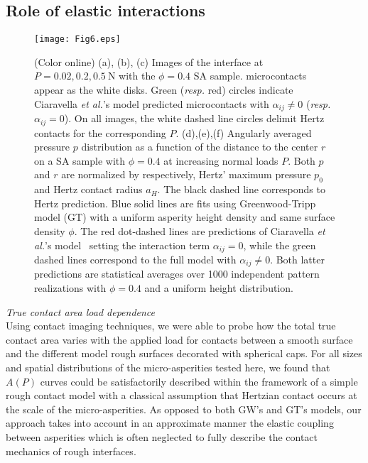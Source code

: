 \documentclass[pre,groupedaddress,showkeys,showpacs,twocolumn]{revtex4}
\begin{document}
\subsection*{Role of elastic interactions}
%
\begin{figure*}[ht]
	\centering
	\texttt{[image: Fig6.eps]}
	\caption{(Color online) (a), (b), (c) Images of the interface at $P=0.02, 0.2, 0.5~$N with the $\phi=0.4$ SA sample. microcontacts appear as the white disks. Green (\textit{resp.} red) circles indicate Ciaravella \textit{et al.}'s model predicted microcontacts with $\alpha_{ij} \neq 0$ (\textit{resp.} $\alpha_{ij} = 0$). On all images, the white dashed line circles delimit Hertz contacts for the corresponding $P$. (d),(e),(f) Angularly averaged pressure $p$ distribution as a function of the distance to the center $r$ on a SA sample with $\phi = 0.4$ at increasing normal loads $P$. Both $p$ and $r$ are normalized by respectively, Hertz' maximum pressure $p_0$ and Hertz contact radius $a_H$. The black dashed line corresponds to Hertz prediction. Blue solid lines are fits using Greenwood-Tripp model (GT) with a uniform asperity height density and same surface density $\phi$. The red dot-dashed lines are predictions of Ciaravella \textit{et al.}'s model~\cite{ciavarella2006,ciavarella2008} setting the 
		interaction term $\alpha_{ij}=0$, while the green dashed lines correspond to the full model with $\alpha_{ij} \neq 0$. Both latter predictions are statistical averages over 1000 independent pattern realizations with $\phi=0.4$ and a uniform height distribution.}
	\label{fig:contact_area_pprofiles} 
\end{figure*}
%
\textit{True contact area load dependence}\\
%
\indent Using contact imaging techniques, we were able to probe how the total true contact area varies with the applied load for contacts between a smooth surface and the different model rough surfaces decorated with spherical caps. For all sizes and spatial distributions of the micro-asperities tested here, we found that $A(P)$ curves could be satisfactorily described within the framework of a simple rough contact model with a classical assumption that Hertzian contact occurs at the scale of the micro-asperities. As opposed to both GW's and GT's models, our approach takes into account in an approximate manner the elastic coupling between asperities which is often neglected to fully describe the contact mechanics of rough interfaces.\\
\end{document}
